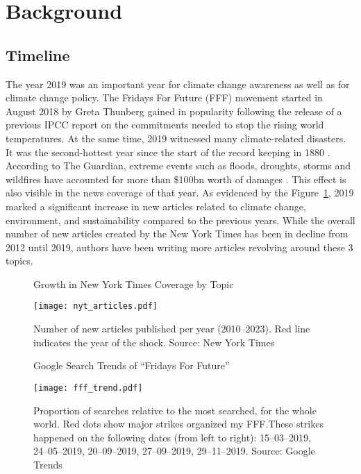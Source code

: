 \documentclass[12pt]{article}
\begin{document}
\section{Background}\label{sect:background}

\subsection{Timeline} 

The year 2019 was an important year for climate change awareness as well as for climate change policy. The Fridays For Future (FFF) movement started in August 2018 by Greta Thunberg gained in popularity following the release of a previous IPCC report on the commitments needed to stop the rising world temperatures. At the same time, 2019 witnessed many climate-related disasters. It was the second-hottest year since the start of the record keeping in 1880 \parencite{noaa2019global}. According to The Guardian, extreme events such as floods, droughts, storms and wildfires have accounted for more than \$100bn worth of damages \parencite{harvey2019climate}. This effect is also visible in the news coverage of that year. As evidenced by the Figure~\ref{fig:news_trends}, 2019 marked a significant increase in new articles related to climate change, environment, and sustainability compared to the previous years. While the overall number of new articles created by the New York Times has been in decline from 2012 until 2019, authors have been writing more articles revolving around these 3 topics. 


\begin{figure}[t]
    \caption{Growth in New York Times Coverage by Topic}\label{fig:news_trends}
    \texttt{[image: nyt\_articles.pdf]}
    \captionsetup{font=footnotesize}
    \caption*{Number of new articles published per year (2010--2023). Red line indicates the year of the shock. Source: New York Times}
\end{figure}

\begin{figure}[t]
    \caption{Google Search Trends of ``Fridays For Future''}\label{fig:fff_trend}
    \texttt{[image: fff\_trend.pdf]}
    \captionsetup{font=footnotesize}
    \caption*{Proportion of searches relative to the most searched, for the whole world. Red dots show major strikes organized my FFF.\@ These strikes happened on the following dates (from left to right): 15--03--2019, 24--05--2019, 20--09--2019, 27--09--2019, 29--11--2019. Source: Google Trends}
\end{figure}
\end{document}
